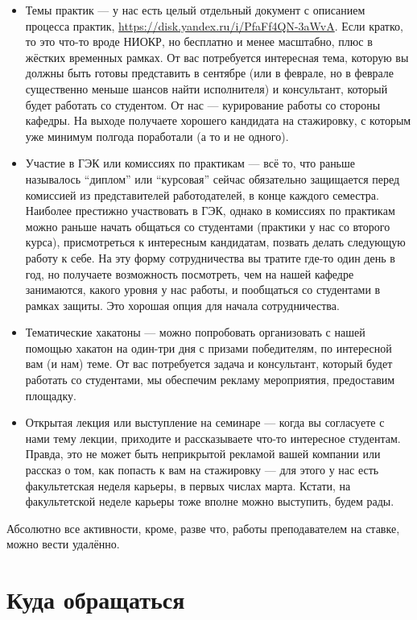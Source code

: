 \documentclass[a5paper]{article}
\begin{document}
\begin{itemize}
    \item Темы практик --- у нас есть целый отдельный документ с описанием процесса практик, \url{https://disk.yandex.ru/i/PfaFf4QN-3aWvA}. Если кратко, то это что-то вроде НИОКР, но бесплатно и менее масштабно, плюс в жёстких временных рамках. От вас потребуется интересная тема, которую вы должны быть готовы представить в сентябре (или в феврале, но в феврале существенно меньше шансов найти исполнителя) и консультант, который будет работать со студентом. От нас --- курирование работы со стороны кафедры. На выходе получаете хорошего кандидата на стажировку, с которым уже минимум полгода поработали (а то и не одного).
    \item Участие в ГЭК или комиссиях по практикам --- всё то, что раньше называлось \enquote{диплом} или \enquote{курсовая} сейчас обязательно защищается перед комиссией из представителей работодателей, в конце каждого семестра. Наиболее престижно участвовать в ГЭК, однако в комиссиях по практикам можно раньше начать общаться со студентами (практики у нас со второго курса), присмотреться к интересным кандидатам, позвать делать следующую работу к себе. На эту форму сотрудничества вы тратите где-то один день в год, но получаете возможность посмотреть, чем на нашей кафедре занимаются, какого уровня у нас работы, и пообщаться со студентами в рамках защиты. Это хорошая опция для начала сотрудничества.
    \item Тематические хакатоны --- можно попробовать организовать с нашей помощью хакатон на один-три дня с призами победителям, по интересной вам (и нам) теме. От вас потребуется задача и консультант, который будет работать со студентами, мы обеспечим рекламу мероприятия, предоставим площадку.
    \item Открытая лекция или выступление на семинаре --- когда вы согласуете с нами тему лекции, приходите и рассказываете что-то интересное студентам. Правда, это не может быть неприкрытой рекламой вашей компании или рассказ о том, как попасть к вам на стажировку --- для этого у нас есть факультетская неделя карьеры, в первых числах марта. Кстати, на факультетской неделе карьеры тоже вполне можно выступить, будем рады.
\end{itemize}

Абсолютно все активности, кроме, разве что, работы преподавателем на ставке, можно вести удалённо.

\section*{Куда обращаться}
\end{document}
